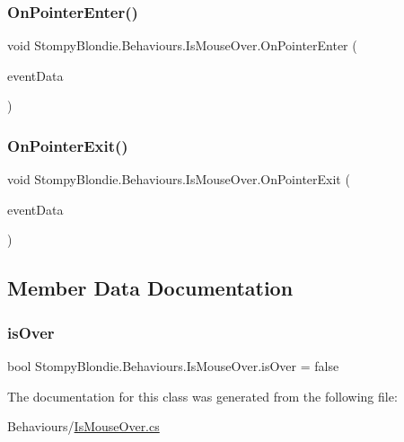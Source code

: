 \subsubsection{\texorpdfstring{On\+Pointer\+Enter()}{OnPointerEnter()}}
{\footnotesize\ttfamily void Stompy\+Blondie.\+Behaviours.\+Is\+Mouse\+Over.\+On\+Pointer\+Enter (\begin{DoxyParamCaption}\item[{Pointer\+Event\+Data}]{event\+Data }\end{DoxyParamCaption})\hspace{0.3cm}{\ttfamily [inline]}}

\mbox{\label{class_stompy_blondie_1_1_behaviours_1_1_is_mouse_over_ad624ad1de28269173b245a8456d34ef8}} 
\subsubsection{\texorpdfstring{On\+Pointer\+Exit()}{OnPointerExit()}}
{\footnotesize\ttfamily void Stompy\+Blondie.\+Behaviours.\+Is\+Mouse\+Over.\+On\+Pointer\+Exit (\begin{DoxyParamCaption}\item[{Pointer\+Event\+Data}]{event\+Data }\end{DoxyParamCaption})\hspace{0.3cm}{\ttfamily [inline]}}



\subsection{Member Data Documentation}
\mbox{\label{class_stompy_blondie_1_1_behaviours_1_1_is_mouse_over_a4b31cf2a692c0cdf41c04d399a70c332}} 
\subsubsection{\texorpdfstring{is\+Over}{isOver}}
{\footnotesize\ttfamily bool Stompy\+Blondie.\+Behaviours.\+Is\+Mouse\+Over.\+is\+Over = false}



The documentation for this class was generated from the following file\+:\begin{DoxyCompactItemize}
\item 
Behaviours/\mbox{\hyperlink{_is_mouse_over_8cs}{Is\+Mouse\+Over.\+cs}}\end{DoxyCompactItemize}
